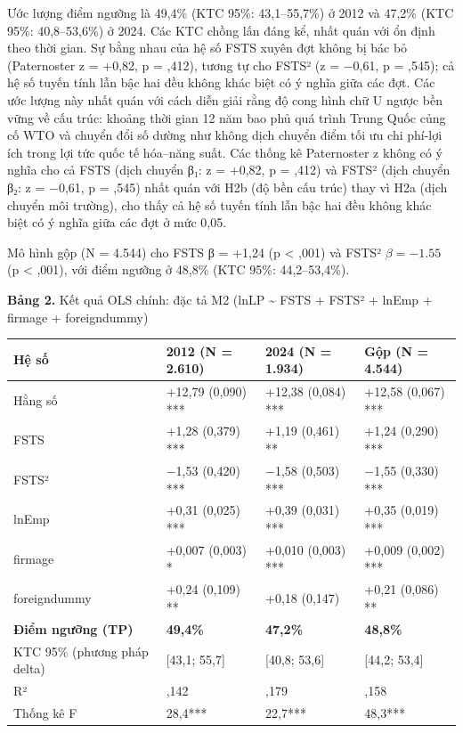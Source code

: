 \documentclass[12pt,a4paper]{article}
\begin{document}
Ước lượng điểm ngưỡng là 49,4\% (KTC 95\%: 43,1--55,7\%) ở 2012 và
47,2\% (KTC 95\%: 40,8--53,6\%) ở 2024. Các KTC chồng lấn đáng kể, nhất
quán với ổn định theo thời gian. Sự bằng nhau của hệ số FSTS xuyên đợt
không bị bác bỏ (Paternoster z = +0,82, p = ,412), tương tự cho FSTS² (z
= −0,61, p = ,545); cả hệ số tuyến tính lẫn bậc hai đều không khác biệt
có ý nghĩa giữa các đợt. Các ước lượng này nhất quán với cách diễn giải
rằng độ cong hình chữ U ngược bền vững về cấu trúc: khoảng thời gian 12
năm bao phủ quá trình Trung Quốc củng cố WTO và chuyển đổi số dường như
không dịch chuyển điểm tối ưu chi phí-lợi ích trong lợi tức quốc tế
hóa--năng suất. Các thống kê Paternoster z không có ý nghĩa cho cả FSTS
(dịch chuyển β₁: z = +0,82, p = ,412) và FSTS² (dịch chuyển β₂: z =
−0,61, p = ,545) nhất quán với H2b (độ bền cấu trúc) thay vì H2a (dịch
chuyển môi trường), cho thấy cả hệ số tuyến tính lẫn bậc hai đều không
khác biệt có ý nghĩa giữa các đợt ở mức 0,05.

Mô hình gộp (N = 4.544) cho FSTS β = +1,24 (p \textless{} ,001) và FSTS²
\(\beta = −1.55\) (p \textless{} ,001), với điểm ngưỡng ở 48,8\% (KTC
95\%: 44,2--53,4\%).

\textbf{Bảng 2.} Kết quả OLS chính: đặc tả M2 (lnLP \textasciitilde{}
FSTS + FSTS² + lnEmp + firmage + foreigndummy)

\begin{longtable}[]{@{}llll@{}}
\toprule\noalign{}
Hệ số & 2012 (N = 2.610) & 2024 (N = 1.934) & Gộp (N = 4.544) \\
\midrule\noalign{}
\endhead
\bottomrule\noalign{}
\endlastfoot
Hằng số & +12,79 (0,090) *** & +12,38 (0,084) *** & +12,58 (0,067)
*** \\
FSTS & +1,28 (0,379) *** & +1,19 (0,461) ** & +1,24 (0,290) *** \\
FSTS² & −1,53 (0,420) *** & −1,58 (0,503) *** & −1,55 (0,330) *** \\
lnEmp & +0,31 (0,025) *** & +0,39 (0,031) *** & +0,35 (0,019) *** \\
firmage & +0,007 (0,003) * & +0,010 (0,003) *** & +0,009 (0,002) *** \\
foreigndummy & +0,24 (0,109) ** & +0,18 (0,147) & +0,21 (0,086) ** \\
\textbf{Điểm ngưỡng (TP)} & \textbf{49,4\%} & \textbf{47,2\%} &
\textbf{48,8\%} \\
KTC 95\% (phương pháp delta) & {[}43,1; 55,7{]} & {[}40,8; 53,6{]} &
{[}44,2; 53,4{]} \\
R² & ,142 & ,179 & ,158 \\
Thống kê F & 28,4*** & 22,7*** & 48,3*** \\
\end{longtable}
\end{document}
